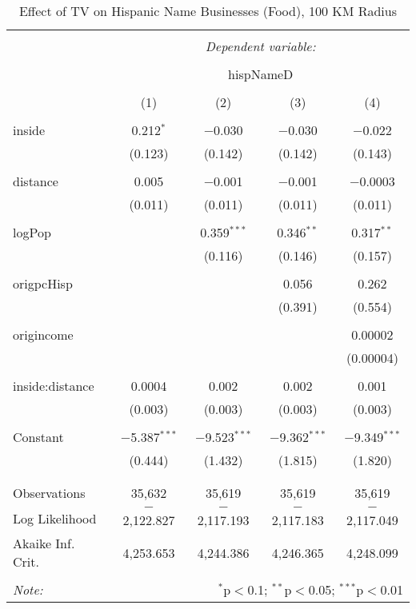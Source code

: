 
\begin{table}[!htbp] \centering 
  \caption{Effect of TV on Hispanic Name Businesses (Food), 100 KM Radius} 
  \label{} 
\begin{tabular}{@{\extracolsep{-5pt}}lcccc} 
\\[-1.8ex]\hline 
\hline \\[-1.8ex] 
 & \multicolumn{4}{c}{\textit{Dependent variable:}} \\ 
\cline{2-5} 
\\[-1.8ex] & \multicolumn{4}{c}{hispNameD} \\ 
\\[-1.8ex] & (1) & (2) & (3) & (4)\\ 
\hline \\[-1.8ex] 
 inside & 0.212$^{*}$ & $-$0.030 & $-$0.030 & $-$0.022 \\ 
  & (0.123) & (0.142) & (0.142) & (0.143) \\ 
  & & & & \\ 
 distance & 0.005 & $-$0.001 & $-$0.001 & $-$0.0003 \\ 
  & (0.011) & (0.011) & (0.011) & (0.011) \\ 
  & & & & \\ 
 logPop &  & 0.359$^{***}$ & 0.346$^{**}$ & 0.317$^{**}$ \\ 
  &  & (0.116) & (0.146) & (0.157) \\ 
  & & & & \\ 
 origpcHisp &  &  & 0.056 & 0.262 \\ 
  &  &  & (0.391) & (0.554) \\ 
  & & & & \\ 
 origincome &  &  &  & 0.00002 \\ 
  &  &  &  & (0.00004) \\ 
  & & & & \\ 
 inside:distance & 0.0004 & 0.002 & 0.002 & 0.001 \\ 
  & (0.003) & (0.003) & (0.003) & (0.003) \\ 
  & & & & \\ 
 Constant & $-$5.387$^{***}$ & $-$9.523$^{***}$ & $-$9.362$^{***}$ & $-$9.349$^{***}$ \\ 
  & (0.444) & (1.432) & (1.815) & (1.820) \\ 
  & & & & \\ 
\hline \\[-1.8ex] 
Observations & 35,632 & 35,619 & 35,619 & 35,619 \\ 
Log Likelihood & $-$2,122.827 & $-$2,117.193 & $-$2,117.183 & $-$2,117.049 \\ 
Akaike Inf. Crit. & 4,253.653 & 4,244.386 & 4,246.365 & 4,248.099 \\ 
\hline 
\hline \\[-1.8ex] 
\textit{Note:}  & \multicolumn{4}{r}{$^{*}$p$<$0.1; $^{**}$p$<$0.05; $^{***}$p$<$0.01} \\ 
\end{tabular} 
\end{table} 
